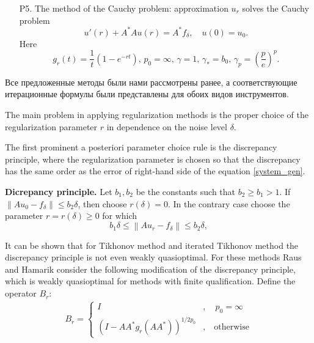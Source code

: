 \documentclass[10pt]{article}
\theoremstyle{definition}
\theoremstyle{remark}
\theoremstyle{plain}
\begin{document}
\begin{itemize}
\item[P5.] 
The method of the Cauchy problem: approximation $u_r$ solves the Cauchy problem 
$$
u'(r) + A^*Au(r) = A^*f_\delta, \quad u(0)= u_0.
$$
Here
$$
g_r(t) = \frac{1}{t}\left(1 - e^{-rt}\right), \,
p_0=\infty, \,
\gamma = 1, \,
\gamma_* = b_0, \,
\gamma_p = \left(\frac{p}{e}\right)^p.
$$
\end{itemize}

Все предложенные методы были нами рассмотрены ранее, а соответствующие итерационные формулы были представлены для обоих видов инструментов.

The main problem in applying regularization methods is the proper choice of the regularization parameter $r$ in dependence on the noise level $\delta$.

The first prominent a posteriori parameter choice rule is the discrepancy principle, where the regularization parameter is chosen so that the discrepancy has the same order as the error of right-hand side of the equation \eqref{system_gen}.





\textbf{Dicrepancy principle.} 
Let $b_1,b_2$ be the constants such that $b_2\geqslant b_1 > 1$. If $\left\|Au_0 - f_\delta\right\|\leqslant b_2\delta$, then choose $r(\delta)=0$. In the contrary case choose the parameter $r = r(\delta)\geqslant 0$ for which 
$$
b_1\delta \leqslant \left\| Au_r - f_\delta \right\| \leqslant b_2\delta,
$$

It can be shown that for Tikhonov method and iterated Tikhonov method the discrepancy
principle is not even weakly quasioptimal. For these methods Raus and Hamarik consider
the following modification of the discrepancy principle, which is weakly quasioptimal for methods with finite qualification. 
Define the operator $B_r$:
\begin{align*}
B_r = 
\left\{
	\begin{aligned}
	I&,\quad p_0 = \infty \\
	(I-AA^*g_r(AA^*))^{1/2p_0}&, \quad \text{otherwise}
	\end{aligned}
\right.
\end{align*}
\end{document}
